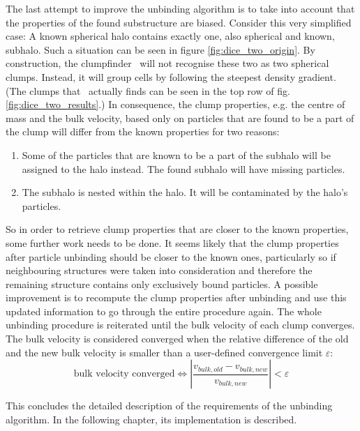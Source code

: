 The last attempt to improve the unbinding algorithm is to take into account that the properties of the found substructure are biased.
Consider this very simplified case: A known spherical halo contains exactly one, also spherical and known, subhalo.
Such a situation can be seen in figure \ref{fig:dice_two_origin}.
By construction, the clumpfinder \phew\ will not recognise these two as two spherical clumps. 
Instead, it will group cells by following the steepest density gradient.
(The clumps that \phew\ actually finds can be seen in the top row of fig. \ref{fig:dice_two_results}.)
In consequence, the clump properties, e.g. the centre of mass and the bulk velocity, based only on particles that are found to be a part of the clump will differ from the known properties for two reasons:
%
\begin{enumerate}
	\item Some of the particles that are known to be a part of the subhalo will be assigned to the halo instead.
	The found subhalo will have missing particles.
	\item The subhalo is nested within the halo.
	It will be contaminated by the halo's particles. 
\end{enumerate}
%
So in order to retrieve clump properties that are closer to the known properties, some further work needs to be done.
It seems likely that the clump properties after particle unbinding should be closer to the known ones, particularly so if neighbouring structures were taken into consideration and therefore the remaining structure contains only exclusively bound particles.
A possible improvement is to recompute the clump properties after unbinding and use this updated information to go through the entire procedure again.
The whole unbinding procedure is reiterated until the bulk velocity of each clump converges.
The bulk velocity is considered converged when the relative difference of the old and the new bulk velocity is smaller than a user-defined convergence limit $\varepsilon$:
\begin{equation}
\text{bulk velocity converged} \Leftrightarrow \left | \frac{v_{bulk,old} - v_{bulk,new}}{v_{bulk,new}} \right | < \varepsilon
\end{equation}


This concludes the detailed description of the requirements of the unbinding algorithm. 
In the following chapter, its implementation is described.